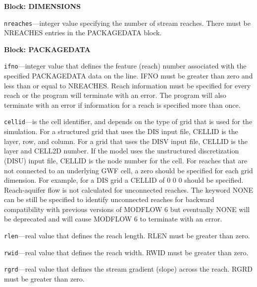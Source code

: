 \item \textbf{Block: DIMENSIONS}

\begin{description}
\item \texttt{nreaches}---integer value specifying the number of stream reaches.  There must be NREACHES entries in the PACKAGEDATA block.

\end{description}
\item \textbf{Block: PACKAGEDATA}

\begin{description}
\item \texttt{ifno}---integer value that defines the feature (reach) number associated with the specified PACKAGEDATA data on the line. IFNO must be greater than zero and less than or equal to NREACHES. Reach information must be specified for every reach or the program will terminate with an error.  The program will also terminate with an error if information for a reach is specified more than once.

\item \texttt{cellid}---is the cell identifier, and depends on the type of grid that is used for the simulation. For a structured grid that uses the DIS input file, CELLID is the layer, row, and column. For a grid that uses the DISV input file, CELLID is the layer and CELL2D number. If the model uses the unstructured discretization (DISU) input file, CELLID is the node number for the cell. For reaches that are not connected to an underlying GWF cell, a zero should be specified for each grid dimension. For example, for a DIS grid a CELLID of 0 0 0 should be specified. Reach-aquifer flow is not calculated for unconnected reaches. The keyword NONE can be still be specified to identify unconnected reaches for backward compatibility with previous versions of MODFLOW 6 but eventually NONE will be deprecated and will cause MODFLOW 6 to terminate with an error.

\item \texttt{rlen}---real value that defines the reach length. RLEN must be greater than zero.

\item \texttt{rwid}---real value that defines the reach width. RWID must be greater than zero.

\item \texttt{rgrd}---real value that defines the stream gradient (slope) across the reach. RGRD must be greater than zero.


\end{description}
